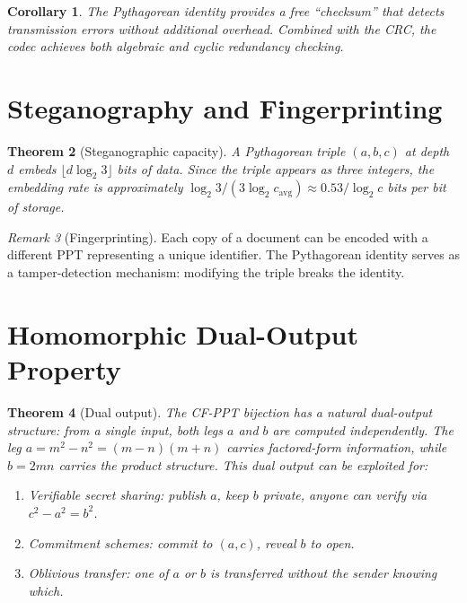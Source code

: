 \documentclass[12pt]{amsart}
\newtheorem{theorem}{Theorem}[section]
\newtheorem{corollary}[theorem]{Corollary}
\theoremstyle{definition}
\theoremstyle{remark}
\newtheorem{remark}[theorem]{Remark}
\begin{document}
\begin{corollary}
The Pythagorean identity provides a free ``checksum'' that detects
transmission errors without additional overhead. Combined with the CRC,
the codec achieves both algebraic and cyclic redundancy checking.
\end{corollary}

\section{Steganography and Fingerprinting}\label{sec:stego}

\begin{theorem}[Steganographic capacity]\label{thm:stego}
A Pythagorean triple $(a, b, c)$ at depth~$d$ embeds $\lfloor d \log_2 3
\rfloor$ bits of data. Since the triple appears as three integers, the
embedding rate is approximately $\log_2 3 / (3 \log_2 c_{\mathrm{avg}})
\approx 0.53/\log_2 c$ bits per bit of storage.
\end{theorem}

\begin{remark}[Fingerprinting]
Each copy of a document can be encoded with a different PPT representing
a unique identifier. The Pythagorean identity serves as a tamper-detection
mechanism: modifying the triple breaks the identity.
\end{remark}

\section{Homomorphic Dual-Output Property}\label{sec:homo}

\begin{theorem}[Dual output]\label{thm:dual}
The CF-PPT bijection has a natural dual-output structure: from a single
input, both legs $a$ and $b$ are computed independently. The leg $a = m^2 - n^2
= (m-n)(m+n)$ carries factored-form information, while $b = 2mn$ carries
the product structure. This dual output can be exploited for:
\begin{enumerate}[label=(\roman*)]
  \item Verifiable secret sharing: publish $a$, keep $b$ private, anyone
    can verify via $c^2 - a^2 = b^2$.
  \item Commitment schemes: commit to $(a, c)$, reveal $b$ to open.
  \item Oblivious transfer: one of $a$ or $b$ is transferred without
    the sender knowing which.
\end{enumerate}
\end{theorem}
\end{document}
